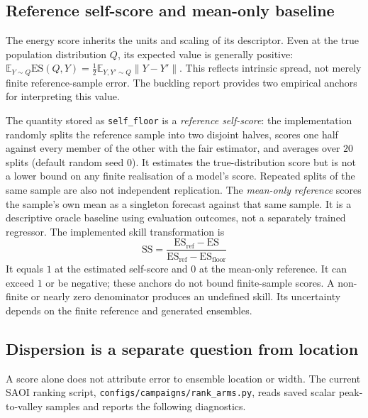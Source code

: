 \subsection{Reference self-score and mean-only baseline}
\label{sec:protocol:baselines}

The energy score inherits the units and scaling of its descriptor. Even at
the true population distribution $Q$, its expected value is generally
positive: $\mathbb{E}_{Y\sim Q}\mathrm{ES}(Q,Y)=
\tfrac12\mathbb{E}_{Y,Y'\sim Q}\|Y-Y'\|$. This reflects intrinsic spread,
not merely finite reference-sample error. The buckling report provides two
empirical anchors for interpreting this value.

The quantity stored as \texttt{self\_floor} is a \emph{reference self-score}:
the implementation randomly splits the reference sample into two disjoint
halves, scores one half against every member of the other with the fair
estimator, and averages over $20$ splits (default random seed $0$). It
estimates the true-distribution score but is not a lower bound on any finite
realisation of a model's score. Repeated splits of the same sample are also
not independent replication. The \emph{mean-only reference} scores the sample's
own mean as a singleton forecast against that same sample. It is a descriptive
oracle baseline using evaluation outcomes, not a separately trained regressor.
The implemented skill transformation is
\begin{equation}
  \mathrm{SS} = \frac{\mathrm{ES}_{\mathrm{ref}}-\mathrm{ES}}
                     {\mathrm{ES}_{\mathrm{ref}}-\mathrm{ES}_{\mathrm{floor}}}
  \label{eq:skill}
\end{equation}
It equals $1$ at the estimated self-score and $0$ at the mean-only reference.
It can exceed $1$ or be negative; these anchors do not bound finite-sample
scores. A non-finite or nearly zero denominator produces an undefined skill.
Its uncertainty depends on the finite reference and generated ensembles.

\subsection{Dispersion is a separate question from location}
\label{sec:protocol:dispersion}

A score alone does not attribute error to ensemble location or width. The
current SAOI ranking script, \texttt{configs/campaigns/rank\_arms.py}, reads
saved scalar peak-to-valley samples and reports the following diagnostics.

